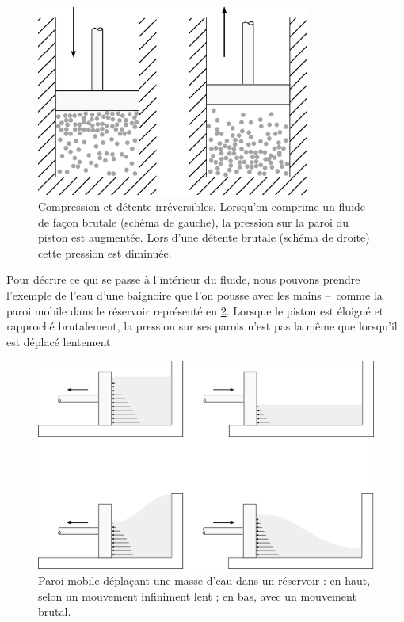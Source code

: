 		\begin{figure}
			\begin{center}
			\includegraphics[width=9cm]{images/particules_compression_rapide.png}
			\end{center}
			\caption{Compression et détente irréversibles. Lorsqu’on comprime un fluide de façon brutale (schéma de gauche), la pression sur la paroi du piston est augmentée. Lors d’une détente brutale (schéma de droite) cette pression est diminuée.}
			\label{fig_molécules_rapide}
		\end{figure}

		Pour décrire ce qui se passe à l’intérieur du fluide, nous pouvons prendre l’exemple de l’eau d’une baignoire que l’on pousse avec les mains --\ comme la paroi mobile dans le réservoir représenté en \cref{fig_baignoire}. Lorsque le piston est éloigné et rapproché brutalement, la pression sur ses parois n’est pas la même que lorsqu’il est déplacé lentement.

		\begin{figure}[htb!]%
			\begin{center}
				\includegraphics[width=\textwidth]{images/mouvement_rapide_niveau_eau.png}
			\end{center}
			\caption{Paroi mobile déplaçant une masse d’eau dans un réservoir : en haut, selon un mouvement infiniment lent ; en bas, avec un mouvement brutal.}%
			\label{fig_baignoire}
		\end{figure}
		
